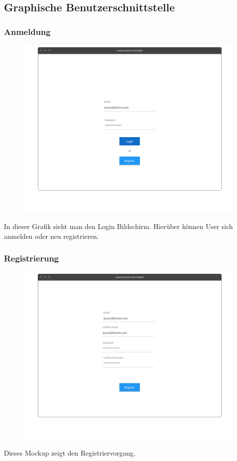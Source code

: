 	\subsection{Graphische Benutzerschnittstelle}
		\label{guimocl}
		\subsubsection{Anmeldung}
			\begin{figure}[H]
				\includegraphics[scale=0.4]{images/p1}
			\end{figure}
			In dieser Grafik sieht man den Login Bildschirm. Hierüber können User sich anmelden oder neu registrieren.  
		
		\subsubsection{Registrierung}
			\begin{figure}[H]
				\includegraphics[scale=0.4]{images/p1reg}
			\end{figure}
			Dieses Mockup zeigt den Registriervorgang. 
		

